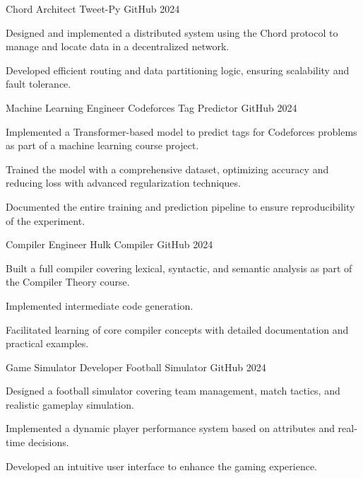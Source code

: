 \begin{cventries}
  \cventry
    {Chord Architect}
    {Tweet-Py}
    {GitHub}
    {2024}
    {
      \begin{cvitems}
        \item {Designed and implemented a distributed system using the Chord protocol to manage and locate data in a decentralized network.}
        \item {Developed efficient routing and data partitioning logic, ensuring scalability and fault tolerance.}
      \end{cvitems}
    }
  \cventry
    {Machine Learning Engineer}
    {Codeforces Tag Predictor}
    {GitHub}
    {2024}
    {
      \begin{cvitems}
        \item {Implemented a Transformer-based model to predict tags for Codeforces problems as part of a machine learning course project.}
        \item {Trained the model with a comprehensive dataset, optimizing accuracy and reducing loss with advanced regularization techniques.}
        \item {Documented the entire training and prediction pipeline to ensure reproducibility of the experiment.}
      \end{cvitems}
    }
  \cventry
    {Compiler Engineer}
    {Hulk Compiler}
    {GitHub}
    {2024}
    {
      \begin{cvitems}
        \item {Built a full compiler covering lexical, syntactic, and semantic analysis as part of the Compiler Theory course.}
        \item {Implemented intermediate code generation.}
        \item {Facilitated learning of core compiler concepts with detailed documentation and practical examples.}
      \end{cvitems}
    }
  \cventry
    {Game Simulator Developer}
    {Football Simulator}
    {GitHub}
    {2024}
    {
      \begin{cvitems}
        \item {Designed a football simulator covering team management, match tactics, and realistic gameplay simulation.}
        \item {Implemented a dynamic player performance system based on attributes and real-time decisions.}
        \item {Developed an intuitive user interface to enhance the gaming experience.}

\end{cvitems}}
\end{cventries}
